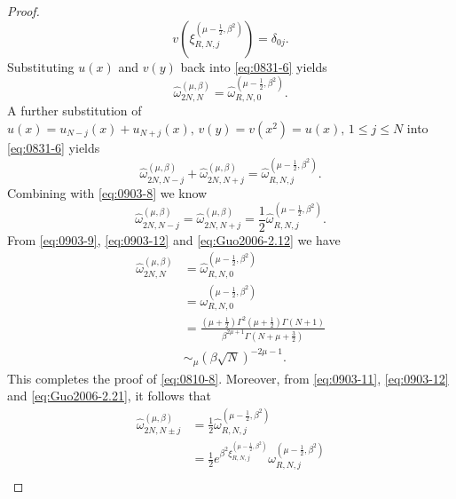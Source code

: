 \documentclass[pdflatex,sn-aps]{sn-jnl}%
\theoremstyle{thmstyleone}%
\theoremstyle{thmstyletwo}%
\theoremstyle{thmstylethree}%
\begin{document}
\begin{appendices}
\begin{proof}
\begin{displaymath}
    v\left(\xi_{R,N,j}^{\left(\mu-\frac{1}{2},\beta^2\right)}\right) = \delta_{0j}.
  \end{displaymath}
  Substituting $u(x)$ and $v(y)$ back into \eqref{eq:0831-6} yields
  \begin{equation}\label{eq:0903-9}
    \widehat{\omega}_{2 N, N}^{(\mu, \beta)}=\widehat{\omega}_{R, N, 0}^{\left(\mu-\frac{1}{2}, \beta^2\right)}.
  \end{equation}
  A further substitution of $u(x)=u_{N-j}(x)+u_{N+j}(x), \,v(y)=v\left(x^2\right)=u(x),\,1\leqslant j \leqslant N$
  into \eqref{eq:0831-6} yields
  \begin{equation}\label{eq:0903-10}
    \widehat{\omega}_{2 N, N-j}^{(\mu, \beta)}+\widehat{\omega}_{2 N, N+j}^{(\mu, \beta)}=\widehat{\omega}_{R, N, j}^{\left(\mu-\frac{1}{2}, \beta^2\right)}.
  \end{equation}
  Combining with \eqref{eq:0903-8} we know
  \begin{equation}\label{eq:0903-11}
    \widehat{\omega}_{2 N, N-j}^{(\mu, \beta)}=\widehat{\omega}_{2 N, N+j}^{(\mu, \beta)}=\frac{1}{2} \widehat{\omega}_{R, N, j}^{\left(\mu-\frac{1}{2}, \beta^2\right)}.
  \end{equation}
  From \eqref{eq:0903-9}, \eqref{eq:0903-12} and \eqref{eq:Guo2006-2.12} we have
  \begin{equation}\label{eq:0903-13}
    \begin{aligned}
    \widehat{\omega}_{2 N, N}^{(\mu, \beta)} & =\widehat{\omega}_{R, N, 0}^{\left(\mu-\frac{1}{2}, \beta^2\right)} \\
    & =\omega_{R, N, 0}^{\left(\mu-\frac{1}{2}, \beta^2\right)} \\
    & =\frac{\left(\mu+\frac{1}{2}\right) \Gamma^2\left(\mu+\frac{1}{2}\right) \Gamma(N+1)}{\beta^{2 \mu+1} \Gamma\left(N+\mu+\frac{3}{2}\right)} \\
    & \sim_\mu(\beta \sqrt{N})^{-2\mu-1}.
    \end{aligned}
  \end{equation}
  This completes the proof of \eqref{eq:0810-8}.
  Moreover, from \eqref{eq:0903-11}, \eqref{eq:0903-12} and \eqref{eq:Guo2006-2.21},
  it follows that
  \begin{equation}
    \begin{aligned}
    \widehat{\omega}_{2 N, N \pm j}^{(\mu, \beta)} & =\frac{1}{2} \widehat{\omega}_{R, N, j}^{\left(\mu-\frac{1}{2}, \beta^2\right)} \\
    & =\frac{1}{2} e^{\beta^2 \xi_{R, N, j}^{\left(\mu-\frac{1}{2}, \beta^2\right)}} \omega_{R, N, j}^{\left(\mu-\frac{1}{2}, \beta^2\right)} \\

\end{aligned}
\end{equation}
\end{proof}
\end{appendices}
\end{document}
